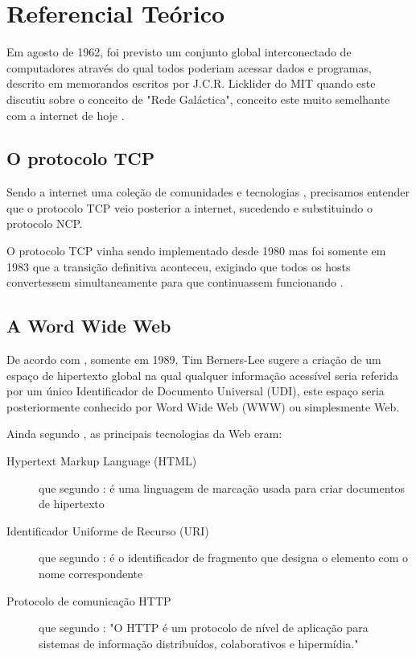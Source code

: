 \section{Referencial Teórico}

Em agosto de 1962, foi previsto um conjunto global interconectado de computadores através do qual todos poderiam acessar dados e programas, descrito em memorandos escritos por J.C.R. Licklider do MIT quando este discutiu sobre o conceito de "Rede Galáctica", conceito este muito semelhante com a internet de hoje \citep[p.~2]{Leiner2009}.

\subsection{O protocolo TCP}

Sendo a internet uma coleção de comunidades e tecnologias \citep[p.~106]{Leiner1997}, precisamos entender que o protocolo TCP veio posterior a internet, sucedendo e substituindo o protocolo NCP.

O protocolo TCP vinha sendo implementado desde 1980 mas foi somente em 1983 que a transição definitiva aconteceu, exigindo que todos os hosts convertessem simultaneamente para que continuassem funcionando \citep[p.~7]{Leiner2009}.

\subsection{A Word Wide Web}

De acordo com \citet{Aghaei2012}, somente em 1989, Tim Berners-Lee sugere a criação de um espaço de hipertexto global na qual qualquer informação acessível seria referida por um único Identificador de Documento Universal (UDI), este espaço seria posteriormente conhecido por Word Wide Web (WWW) ou simplesmente Web.

Ainda segundo \citet{Aghaei2012}, as principais tecnologias da Web eram:
\begin{description}
	\item[Hypertext Markup Language (HTML)] que segundo \citet{Berners-Lee1993}: é uma linguagem de marcação usada para criar documentos de hipertexto

	\item[Identificador Uniforme de Recurso (URI)]  que segundo \citet{Connolly2000}: é o identificador de fragmento que designa o elemento com o nome correspondente

	\item[Protocolo de comunicação HTTP] que segundo \citet[p.~7]{Fielding1999}: "O HTTP é um protocolo de nível de aplicação para sistemas de informação distribuídos, colaborativos e hipermídia."
\end{description}

